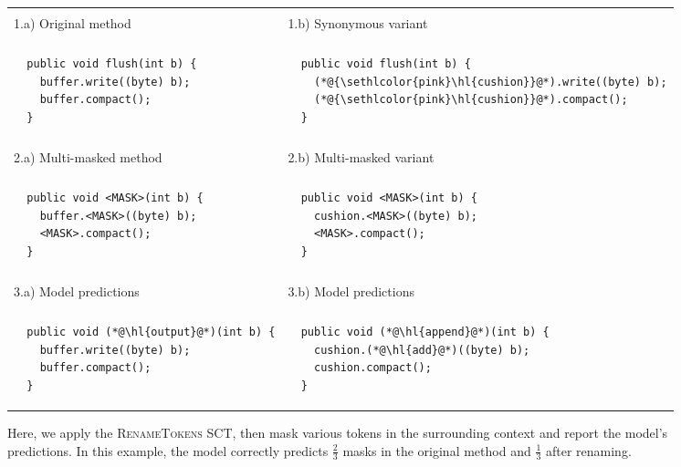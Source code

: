 \documentclass[usenames,dvipsnames]{article} %
\DeclareRobustCommand{\hlred}[1]{{\sethlcolor{pink}\hl{#1}}}
\begin{document}
  \begin{figure}[H]
    \begin{center}
      \begin{tabular}{|p{5cm}|p{5cm}|}
        \hline\\[-1em]1.a) Original method  &  1.b) Synonymous variant\\[-1em]\\\hline
        \begin{lstlisting}
  public void flush(int b) {
    buffer.write((byte) b);
    buffer.compact();
  }
        \end{lstlisting} & \begin{lstlisting}
  public void flush(int b) {
    (*@\hlred{cushion}@*).write((byte) b);
    (*@\hlred{cushion}@*).compact();
  }
        \end{lstlisting}
        \\\hline\\[-1em]2.a) Multi-masked method   &  2.b) Multi-masked variant\\[-1em]\\\hline
        \begin{lstlisting}
  public void <MASK>(int b) {
    buffer.<MASK>((byte) b);
    <MASK>.compact();
  }
        \end{lstlisting} & \begin{lstlisting}
  public void <MASK>(int b) {
    cushion.<MASK>((byte) b);
    <MASK>.compact();
  }
        \end{lstlisting}
        \\\hline\\[-1em]3.a) Model predictions  &  3.b) Model predictions\\[-1em]\\\hline
        \begin{lstlisting}
  public void (*@\hl{output}@*)(int b) {
    buffer.write((byte) b);
    buffer.compact();
  }
        \end{lstlisting} & \begin{lstlisting}
  public void (*@\hl{append}@*)(int b) {
    cushion.(*@\hl{add}@*)((byte) b);
    cushion.compact();
  }
        \end{lstlisting} \\\hline
      \end{tabular}
    \end{center}
    \caption{Here, we apply the \textsc{RenameTokens} SCT, then mask various tokens in the surrounding context and report the model's predictions. In this example, the model correctly predicts $\frac{2}{3}$ masks in the original method and $\frac{1}{3}$ after renaming.}
    \label{fig:code_completion}
  \end{figure}
\end{document}
